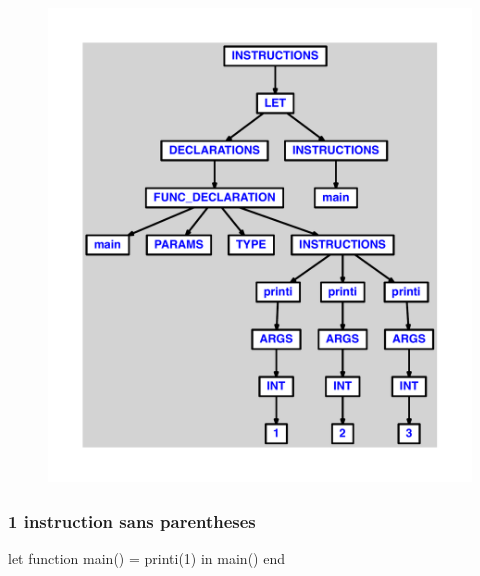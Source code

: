 \documentclass{article}
\begin{document}
\begin{figure}[H]\centering\includegraphics[max width=\textwidth]{ast/ast_137.pdf}\end{figure}\subsubsection{1 instruction sans parentheses}
\begin{verbatimtab}
let function main() = printi(1) in main() end
\end{verbatimtab}
\end{document}
